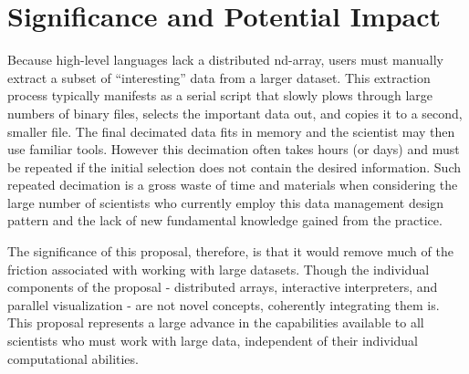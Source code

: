 \documentclass[letterpaper,12pt]{article}
\begin{document}






\section*{Significance and Potential Impact}

Because high-level languages lack a distributed nd-array, users must manually extract a subset
 of ``interesting'' data from a larger dataset.  This extraction process typically manifests 
as a serial script that slowly plows through large numbers of binary files, selects the 
important data out, and copies it to a second, smaller file.  The final decimated data fits 
in memory and the scientist may then use familiar tools.   However this decimation often takes 
hours (or days) and must be repeated if the initial selection does not contain the desired 
information.  Such repeated decimation is a gross waste of time and materials when considering 
the large number of scientists who currently employ this data management design pattern and
the lack of new fundamental knowledge gained from the practice.

The significance of this proposal, therefore, is that it would remove much of the friction 
associated with working with large datasets.  Though the individual components of the 
proposal - distributed arrays, interactive interpreters, and parallel visualization - are 
not novel concepts, coherently integrating them is.  This proposal represents a large 
advance in the capabilities available to all scientists who must work with large data, 
independent of their individual computational abilities.
\end{document}
